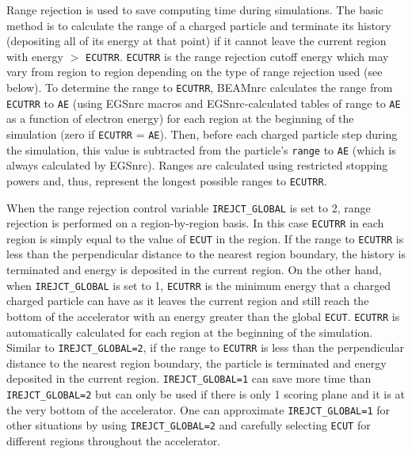 \documentclass[12pt,twoside]{article}
\begin{document}
Range rejection is used to save computing time during simulations.  The
basic method is to calculate the range of a charged particle and
terminate its history (depositing all of its energy at that point)
if it cannot leave the current region with
energy $>$ {\tt ECUTRR}.  {\tt ECUTRR} is the range
rejection cutoff energy which may vary
from region to region depending on the type of range rejection used
(see below).
  To
determine the range to {\tt ECUTRR}, BEAMnrc calculates the range from
{\tt ECUTRR} to {\tt AE} (using EGSnrc macros and EGSnrc-calculated
tables of range to {\tt AE} as a function of electron energy) for each
region at the beginning of the simulation (zero if {\tt ECUTRR} = {\tt AE}).
Then, before each charged particle
step during the simulation, this value is subtracted from the particle's
{\tt range} to {\tt AE} (which is always calculated by EGSnrc).
Ranges are calculated using restricted stopping powers and, thus,
represent
the longest possible ranges to {\tt ECUTRR}.

When the range rejection control variable
\verb+IREJCT_GLOBAL+ is set to 2, range rejection is
performed on a region-by-region basis.  In this case {\tt ECUTRR} in
each region is simply equal to the value of {\tt ECUT} in the region.
If the range to {\tt ECUTRR} is less than the perpendicular distance to
the nearest region boundary,
the history is terminated and energy is deposited in the current region.
On the other hand,
when \verb+IREJCT_GLOBAL+ is set to 1, {\tt ECUTRR} is the minimum energy
that a charged charged particle can have as it
leaves the current region and still reach the bottom of the
accelerator with an energy greater than the global \verb+ECUT+.
\verb+ECUTRR+ is automatically calculated for each region at the beginning of
the simulation.  Similar to {\tt IREJCT\_GLOBAL=2}, if the range to
\verb+ECUTRR+ is less than the perpendicular distance to the nearest region
boundary, the
particle is terminated and energy deposited in the current region.
\verb+IREJCT_GLOBAL=1+ can save more time than
\verb+IREJCT_GLOBAL=2+ but can only be used if
there is only 1 scoring plane and it is at the very bottom of the
accelerator.  One can approximate \verb+IREJCT_GLOBAL=1+ for other
situations by using \verb+IREJCT_GLOBAL=2+ and carefully selecting
\verb+ECUT+ for different regions throughout the accelerator.
\end{document}

